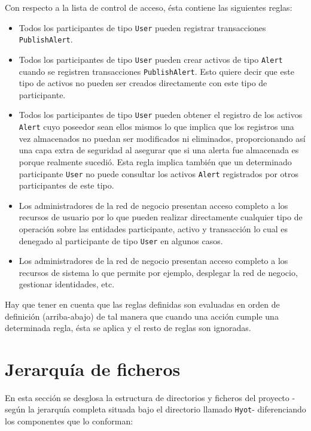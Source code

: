 \documentclass[12pt,a4paper, twoside]{report}
\begin{document}
	Con respecto a la lista de control de acceso, ésta contiene las siguientes reglas:
	
	\begin{itemize}
		\item Todos los participantes de tipo \texttt{User} pueden registrar transacciones \texttt{PublishAlert}.
		\item Todos los participantes de tipo \texttt{User} pueden crear activos de tipo \texttt{Alert} cuando se registren transacciones \texttt{PublishAlert}. Esto quiere decir que este tipo de activos no pueden ser creados directamente con este tipo de participante.
		\item Todos los participantes de tipo \texttt{User} pueden obtener el registro de los activos \texttt{Alert} cuyo poseedor sean ellos mismos lo que implica que los registros una vez almacenados no puedan ser modificados ni eliminados, proporcionando así una capa extra de seguridad al asegurar que si una alerta fue almacenada es porque realmente sucedió. Esta regla implica también que un determinado participante \texttt{User} no puede consultar los activos \texttt{Alert} registrados por otros participantes de este tipo.
		\item Los administradores de la red de negocio presentan acceso completo a los recursos de usuario por lo que pueden realizar directamente cualquier tipo de operación sobre las entidades participante, activo y transacción lo cual es denegado al participante de tipo \texttt{User} en algunos casos.
		\item Los administradores de la red de negocio presentan acceso completo a los recursos de sistema lo que permite por ejemplo, desplegar la red de negocio, gestionar identidades, etc.
	\end{itemize}

	Hay que tener en cuenta que las reglas definidas son evaluadas en orden de definición (arriba-abajo) de tal manera que cuando una acción cumple una determinada regla, ésta se aplica y el resto de reglas son ignoradas.

	\section{Jerarquía de ficheros}
	
	En esta sección se desglosa la estructura de directorios y ficheros del proyecto -según la jerarquía completa situada bajo el directorio llamado \texttt{Hyot}- diferenciando los componentes que lo conforman:
		
\end{document}

